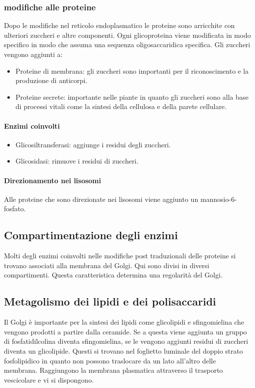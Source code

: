 		\subsubsection{modifiche alle proteine}
		Dopo le modifiche nel reticolo endoplasmatico le proteine sono arricchite con ulteriori zuccheri e altre componenti.
		Ogni glicoproteina viene modificata in modo specifico in modo che assuma una sequenza oligosaccaridica specifica.
		Gli zuccheri vengono aggiunti a:
		\begin{multicols}{2}
			\begin{itemize}
				\item Proteine di membrana: gli zuccheri sono importanti per il riconoscimento e la produzione di anticorpi.
				\item Proteine secrete: importante nelle piante in quanto gli zuccheri sono alla base di processi vitali come la sintesi della cellulosa e della parete cellulare.
			\end{itemize}
		\end{multicols}

			\paragraph{Enzimi coinvolti}
			\begin{multicols}{2}
				\begin{itemize}
					\item Glicosiltransferasi: aggiunge i residui degli zuccheri.
					\item Glicosidasi: rimuove i residui di zuccheri.
				\end{itemize}
			\end{multicols}

			\paragraph{Direzionamento nei lisosomi}
			Alle proteine che sono direzionate nei lisosomi viene aggiunto un mannosio-6-fosfato.

	\subsection{Compartimentazione degli enzimi}
	Molti degli enzimi coinvolti nelle modifiche post traduzionali delle proteine si trovano associati alla membrana del Golgi.
	Qui sono divisi in diversi compartimenti.
	Questa caratteristica determina una regolarit\`a del Golgi.

	\subsection{Metagolismo dei lipidi e dei polisaccaridi}
	Il Golgi \`e importante per la sintesi dei lipidi come glicolipidi e sfingomielina che vengono prodotti a partire dalla ceramide.
	Se a questa viene aggiunta un gruppo di fosfatidilcolina diventa sfingomielina, se le vengono aggiunti residui di zuccheri diventa un glicolipide.
	Questi si trovano nel foglietto luminale del doppio strato fosfolipidico in quanto non possono traslocare da un lato all'altro delle membrana.
	Raggiungono la membrana plasmatica attraverso il trasporto vescicolare e vi si dispongono.

